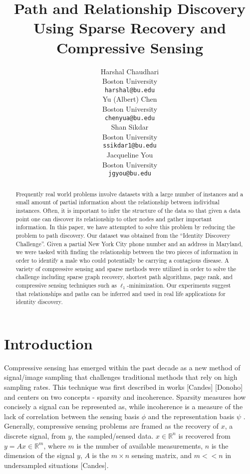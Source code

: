 \documentclass{article} %
\title{Path and Relationship Discovery Using Sparse Recovery and Compressive Sensing}
\author{
Harshal Chaudhari\\
Boston University \\
\texttt{harshal@bu.edu} \\
\And
Yu (Albert) Chen\\
Boston University \\
\texttt{chenyua@bu.edu} \\
\And
Shan Sikdar\\
Boston University  \\
\texttt{ssikdar1@bu.edu} \\
\And
Jacqueline You\\
Boston University \\
\texttt{jgyou@bu.edu} \\
}
\begin{document}
\maketitle

\begin{abstract}
Frequently real world problems involve datasets with a large number of instances and a small amount of partial information about the relationship between individual instances. Often, it is important to infer the structure of the data so that given a data point one can discover its relationship to other nodes and gather important information. In this paper, we have attempted to solve this problem by reducing the problem to path discovery.  Our dataset was obtained from the “Identity Discovery Challenge”. Given a partial New York City phone number and an address in Maryland, we were tasked with finding the relationship between the two pieces of information in order to identify a male who could potentially be carrying a contagious disease.  A variety of compressive sensing and sparse methods were utilized in order to solve the challenge including sparse graph recovery, shortest path algorithms, page rank, and compressive sensing techniques such as $\ell_1$-minimization. Our experiments suggest that relationships and paths can be inferred and used in real life applications for identity discovery.
\end{abstract}


\section{Introduction}


Compressive sensing has emerged within the past decade as a new method of signal/image sampling that challenges traditional methods that rely on high sampling rates. This technique was first described in works [Candes] [Donoho] and centers on two concepts - sparsity and incoherence. Sparsity measures how concisely a signal can be represented as, while incoherence is a measure of the lack of correlation between the sensing basis $\phi$ and the representation basis $\psi$ . Generally, compressive sensing problems are framed as the recovery of $x$, a discrete signal, from $y$, the sampled/sensed data. $x \in  \mathbb{R}^n$ is recovered from $y=Ax \in  \mathbb{R}^m $, where $m$ is the number of available measurements, $n$ is the dimension of the signal $y$, $A$ is the $m \times n$ sensing matrix, and $m << n$  in undersampled situations [Candes].
\end{document}
